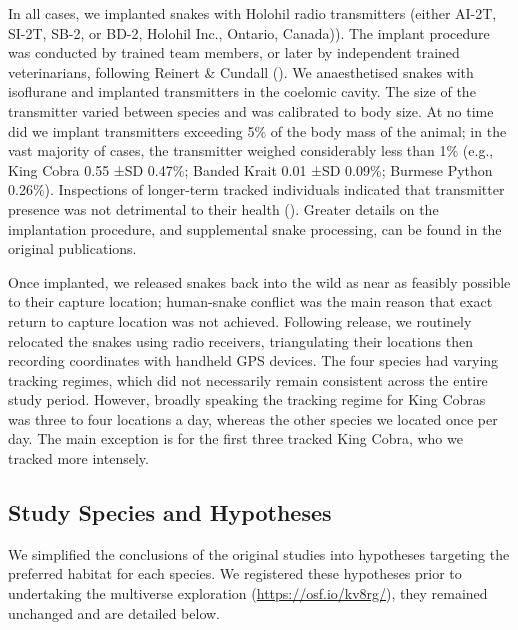 \documentclass[10pt,a4paper]{article}
\begin{document}
In all cases, we implanted snakes with Holohil radio transmitters (either AI-2T, SI-2T, SB-2, or BD-2, Holohil Inc., Ontario, Canada)).
The implant procedure was conducted by trained team members, or later by independent trained veterinarians, following Reinert \& Cundall ().
We anaesthetised snakes with isoflurane and implanted transmitters in the coelomic cavity.
The size of the transmitter varied between species and was calibrated to body size.
At no time did we implant transmitters exceeding 5\% of the body mass of the animal; in the vast majority of cases, the transmitter weighed considerably less than 1\% (e.g., King Cobra 0.55 ±SD 0.47\%; Banded Krait 0.01 ±SD 0.09\%; Burmese Python 0.26\%).
Inspections of longer-term tracked individuals indicated that transmitter presence was not detrimental to their health ().
Greater details on the implantation procedure, and supplemental snake processing, can be found in the original publications.

Once implanted, we released snakes back into the wild as near as feasibly possible to their capture location; human-snake conflict was the main reason that exact return to capture location was not achieved.
Following release, we routinely relocated the snakes using radio receivers, triangulating their locations then recording coordinates with handheld GPS devices.
The four species had varying tracking regimes, which did not necessarily remain consistent across the entire study period.
However, broadly speaking the tracking regime for King Cobras was three to four locations a day, whereas the other species we located once per day.
The main exception is for the first three tracked King Cobra, who we tracked more intensely.

\subsection{Study Species and Hypotheses}\label{study-species-and-hypotheses}

We simplified the conclusions of the original studies into hypotheses targeting the preferred habitat for each species.
We registered these hypotheses prior to undertaking the multiverse exploration (\url{https://osf.io/kv8rg/}), they remained unchanged and are detailed below.
\end{document}
